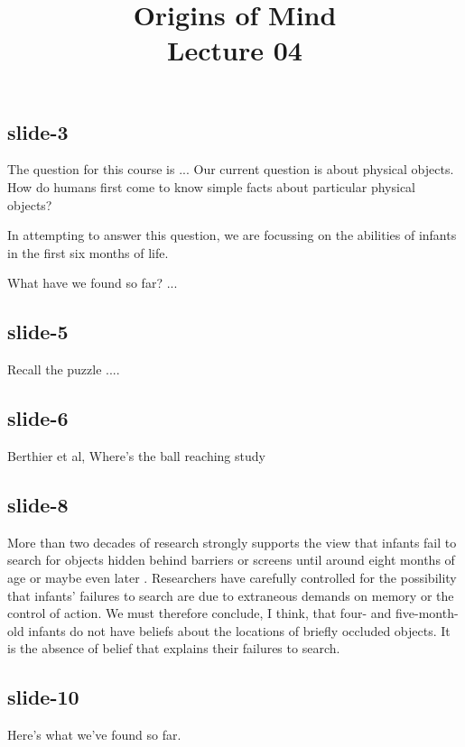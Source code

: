 \documentclass[12pt,\papersize]{extarticle}
\begin{document}
\setlength\footnotesep{1em}








\title {Origins of Mind \\ Lecture 04}



\maketitle

\subsection{slide-3}
The question for this course is ...
Our current question is about physical objects.
How do humans first come to know simple facts about particular physical objects?

In attempting to answer this question, we are focussing on the abilities of
infants in the first six months of life.

What have we found so far? ...

\subsection{slide-5}
Recall the puzzle ....

\subsection{slide-6}
Berthier et al, Where’s the ball reaching study

\subsection{slide-8}
More than two decades of research strongly supports the view that
infants fail to search for objects hidden behind barriers or screens
until around eight months of age \citep[p.\ 202]{Meltzoff:1998wp} or
maybe even later \citep{moore:2008_factors}.
Researchers have carefully controlled for the possibility that infants’
failures to search are due to extraneous demands on memory or the
control of action.
We must therefore conclude, I think, that four- and five-month-old
infants do not have beliefs about the locations of briefly occluded
objects.
It is the absence of belief that explains their failures to search.

\subsection{slide-10}
Here’s what we’ve found so far.
\end{document}
